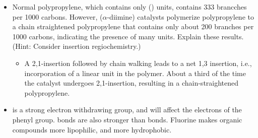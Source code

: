 \documentclass[../notes.tex]{subfiles}
\begin{document}
\begin{itemize}
\begin{itemize}
    \end{itemize}
    \item Normal polypropylene, which contains only () units, contains 333  brancches per 1000 carbons. However, ($\alpha$-diimine) catalysts polymerize polypropylene to a chain straightened polypropylene that contains only about 200 branches per 1000 carbons, indicating the presence of many  units. Explain these results. (Hint: Consider insertion regiochemistry.)
    \begin{itemize}
        \item A 2,1-insertion followed by chain walking leads to a net 1,3 insertion, i.e., incorporation of a linear  unit in the polymer. About a third of the time the catalyst undergoes 2,1-insertion, resulting in a chain-straightened polypropylene.
    \end{itemize}
    \item {} is a strong electron withdrawing group, and will affect the electrons of the phenyl group.  bonds are also stronger than  bonds. Fluorine makes organic compounds more lipophilic, and more hydrophobic.
\end{itemize}
\end{document}
